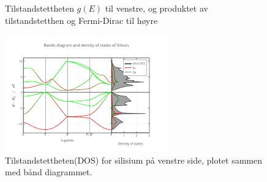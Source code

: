 \begin{figure}[!htb]
    \centering
    \qquad
    \caption{Tilstandstettheten $g(E)$ til venstre, og produktet av tilstandstetthen og Fermi-Dirac til høyre}%
    \label{fig:dobbelgreie}%
\end{figure}

\begin{figure}[!htb]
    \centering
    \includegraphics[scale=1.5]{Bilder/SamtaleTema6/DOS.png}
    \caption{Tilstandstettheten(DOS) for silisium på venstre side, plotet sammen med bånd diagrammet.}
    \label{fig:DOS_plot}
\end{figure}


